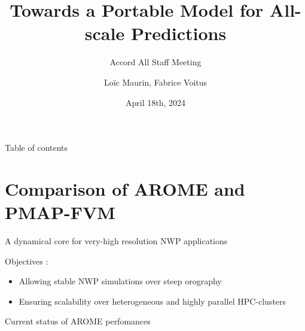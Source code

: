 \documentclass[10pt]{beamer}
\title[Accord All Staff Meeting]{Towards a Portable Model for All-scale Predictions}
\subtitle{Accord All Staff Meeting}
\author{Loïc Maurin, Fabrice Voitus}
\institute[CNRM]{Centre National de Recherche Météorologique}
\date{April 18th, 2024}
\begin{document}
\frame{\titlepage}

\begin{frame}{Table of contents}
    \tableofcontents
\end{frame}

\section{Comparison of AROME and PMAP-FVM}
\begin{frame}{A dynamical core for very-high resolution NWP applications}

    \begin{block}{Objectives :}
        \vspace{0.5cm}
        \begin{itemize}
            \item[\faIcon{mountain}] Allowing stable NWP simulations over steep orography
        \end{itemize}
        \vspace{1cm}
        \begin{itemize}
            \item[\faIcon{laptop-code}] Ensuring scalability over heterogeneous and highly parallel  HPC-clusters
        \end{itemize}
    \end{block}

\end{frame}

\begin{frame}{Current status of AROME perfomances}

\end{frame}
\end{document}
